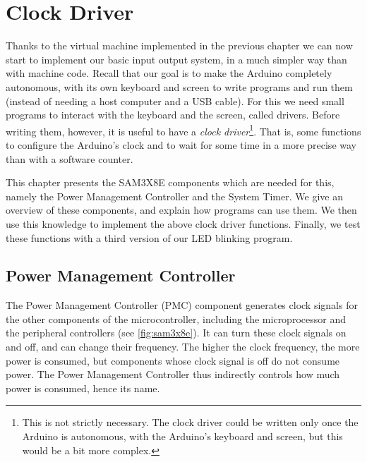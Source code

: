 
\renewcommand{\rustfile}{chapter4}
\setcounter{rustid}{0}


\chapter{Clock Driver}\label{chapter:clock}

Thanks to the virtual machine implemented in the previous chapter we can now
start to implement our basic input output system, in a much simpler way than
with machine code. Recall that our goal is to make the Arduino completely
autonomous, with its own keyboard and screen to write programs and run them
(instead of needing a host computer and a USB cable). For this we need small
programs to interact with the keyboard and the screen, called drivers. Before
writing them, however, it is useful to have a {\em clock driver}\footnote{This
is not strictly necessary. The clock driver could be written only once the
Arduino is autonomous, with the Arduino's keyboard and screen, but this would
be a bit more complex.}. That is, some functions to configure the Arduino's
clock and to wait for some time in a more precise way than with a software
counter.

This chapter presents the SAM3X8E components which are needed for this, namely
the Power Management Controller and the System Timer. We give an overview of
these components, and explain how programs can use them. We then use this
knowledge to implement the above clock driver functions. Finally, we test these
functions with a third version of our LED blinking program.

\section{Power Management Controller}\label{section:pmc}

The Power Management Controller (PMC) component generates clock signals for the
other components of the microcontroller, including the microprocessor and the
peripheral controllers (see \cref{fig:sam3x8e}). It can turn these clock
signals on and off, and can change their frequency. The higher the clock
frequency, the more power is consumed, but components whose clock signal is off
do not consume power. The Power Management Controller thus indirectly controls
how much power is consumed, hence its name.

